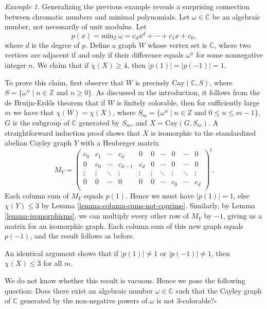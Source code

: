 \documentclass{article}
\theoremstyle{definition}
\theoremstyle{remark}
\newtheorem{Ex}[Thm]{Example}
\begin{document}
\begin{Ex}\label{example-minimal-polynomial}Generalizing the previous example reveals a surprising connection between chromatic numbers and minimal polynomials.  Let $\omega\in\mathbb{C}$ be an algebraic number, not necessarily of unit modulus.  Let $$p(x)=\text{min}_\mathbb{Z}\,\omega=c_d x^d+\cdots + c_1 x + c_0,$$where $d$ is the degree of $p$.  Define a graph $W$ whose vertex set is $\mathbb{C}$, where two vertices are adjacent if and only if their difference equals $\omega^n$ for some nonnegative integer $n$.  We claim that if $\chi(X)\geq 4$, then $|p(1)|=|p(-1)|=1$.

To prove this claim, first observe that $W$ is precisely $\text{Cay}(\mathbb{C},S)$, where $S=\{\omega^n\;|\;n\in\mathbb{Z}\text{ and }n\geq 0\}$.  As discussed in the introduction, it follows from the de Bruijn-Erd\H{o}s theorem that if $W$ is finitely colorable, then for sufficiently large $m$ we have that $\chi(W)=\chi(X)$, where $S_m=\{\omega^n\;|\;n\in\mathbb{Z}\text{ and }0\leq n\leq m-1\}$, $G$ is the subgroup of $\mathbb{C}$ generated by $S_m$, and $X=\text{Cay}(G,S_m)$.  A straightforward induction proof shows that $X$ is isomorphic to the standardized abelian Cayley graph $Y$ with a Heuberger matrix \[M_Y=\begin{pmatrix}
c_0 & c_1 & \cdots & c_d & 0 & 0 & \cdots & 0 & \cdots & 0\\
0 & c_0 & \cdots & c_{d-1} & c_d & 0 & \cdots & 0 & \cdots & 0\\
\vdots & \vdots & \ddots & \vdots & \vdots & \vdots & \ddots & \vdots & \ddots & \vdots\\
0 & 0 & \cdots & 0 & 0 & 0 & \cdots & c_0 & \cdots & c_d\\
\end{pmatrix}^t.\]Each column sum of $M_Y$ equals $p(1)$.  Hence we must have $|p(1)|=1$, else $\chi(Y)\leq 3$ by Lemma \ref{lemma-column-sums-not-coprime}.  Similarly, by Lemma \ref{lemma-isomorphisms}, we can multiply every other row of $M_Y$ by $-1$, giving us a matrix for an isomorphic graph.  Each column sum of this new graph equals $p(-1)$, and the result follows as before.

An identical argument shows that if $|p(1)|\neq 1$ or $|p(-1)|\neq 1$, then $\chi(X)\leq 3$ for all $m$.  %

We do not know whether this result is vacuous.  Hence we pose the following question: Does there exist an algebraic number $\omega\in\mathbb{C}$ such that the Cayley graph of $\mathbb{C}$ generated by the non-negative powers of $\omega$ is not $3$-colorable?\hfill$\square$\end{Ex}
\end{document}
